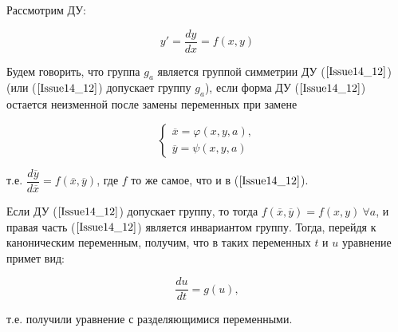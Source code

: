 Рассмотрим ДУ: 

\begin{equation}
 	y' = \dfrac{dy}{dx} = f(x,y)
 	\label{Issue14_12}
\end{equation}

Будем говорить, что группа $g_a$ является $\textbf{группой симметрии}$ ДУ ($\ref{Issue14_12}$) (или ($\ref{Issue14_12}$) допускает группу $g_a$), если форма ДУ ($\ref{Issue14_12}$) остается неизменной после замены переменных при замене 

\begin{equation}
	\begin{cases}
	\overline{x} = \varphi(x,y,a), \\
	\overline{y} = \psi(x,y,a)
	\end{cases}
\end{equation}

т.е. $\dfrac{d\overline{y}}{d\overline{x}} = f(\overline{x}, \overline{y})$, где $f$ то же самое, что и в ($\ref{Issue14_12}$).

Если ДУ ($\ref{Issue14_12}$) допускает группу, то тогда $f(\overline{x}, \overline{y}) = f(x,y)\ \forall a$, и правая часть ($\ref{Issue14_12}$) является инвариантом группу. Тогда, перейдя к каноническим переменным, получим, что в таких переменных $t$ и $u$ уравнение примет вид:

\begin{equation}
	\dfrac{du}{dt} = g(u),
	\label{Issue14_13}
\end{equation}

т.е. получили уравнение с разделяющимися переменными.
























 
